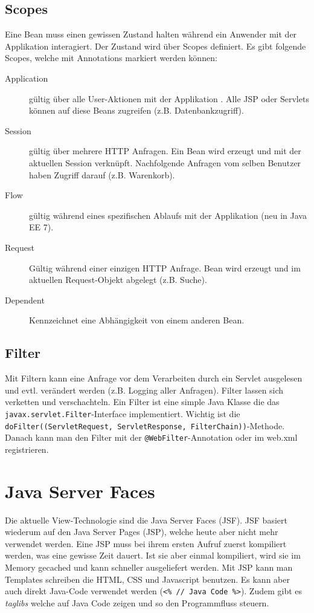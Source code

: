 \subsection{Scopes}
\label{sec:scope}

Eine Bean muss einen gewissen Zustand halten während ein Anwender mit der Applikation interagiert. Der Zustand wird über Scopes definiert. Es gibt folgende Scopes, welche mit Annotations markiert werden können:
\begin{description}
	\item[Application] gültig über alle User-Aktionen mit der Applikation . Alle JSP oder Servlets können auf diese Beans zugreifen (z.B. Datenbankzugriff).
	\item[Session] gültig über mehrere HTTP Anfragen. Ein Bean wird erzeugt und mit der aktuellen Session verknüpft. Nachfolgende Anfragen vom selben Benutzer haben Zugriff darauf (z.B. Warenkorb).
	\item[Flow] gültig während eines spezifischen Ablaufs mit der Applikation (neu in Java EE 7). 
	\item[Request] Gültig während einer einzigen HTTP Anfrage. Bean wird erzeugt und im aktuellen Request-Objekt abgelegt (z.B. Suche).
	\item[Dependent] Kennzeichnet eine Abhängigkeit von einem anderen Bean.
\end{description}

\subsection{Filter}

Mit Filtern kann eine Anfrage vor dem Verarbeiten durch ein Servlet ausgelesen und evtl. verändert werden (z.B. Logging aller Anfragen). Filter lassen sich verketten und verschachteln. Ein Filter ist eine simple Java Klasse die das \verb|javax.servlet.Filter|-Interface implementiert. Wichtig ist die \verb|doFilter((ServletRequest, ServletResponse, FilterChain))|-Methode. Danach kann man den Filter mit der \verb|@WebFilter|-Annotation oder im web.xml registrieren.

\section{Java Server Faces}

Die aktuelle View-Technologie sind die Java Server Faces (JSF). JSF basiert wiederum auf den Java Server Pages (JSP), welche heute aber nicht mehr verwendet werden. Eine JSP muss bei ihrem ersten Aufruf zuerst kompiliert werden, was eine gewisse Zeit dauert. Ist sie aber einmal kompiliert, wird sie im Memory gecached und kann schneller ausgeliefert werden. Mit JSP kann man Templates schreiben die HTML, CSS und Javascript benutzen. Es kann aber auch direkt Java-Code verwendet werden (\verb|<% // Java Code %>|). Zudem gibt es \textit{taglibs} welche auf Java Code zeigen und so den Programmfluss steuern.

